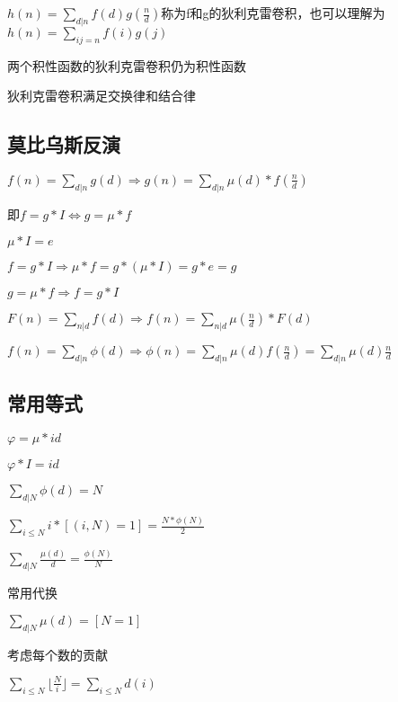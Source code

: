 \documentclass[UTF8]{ctexart}
\begin{document}
$h(n)=\sum_{d|n}f(d)g(\frac{n}{d})$称为f和g的狄利克雷卷积，也可以理解为$h(n)=\sum_{ij=n}f(i)g(j)$\par

两个积性函数的狄利克雷卷积仍为积性函数\par

狄利克雷卷积满足交换律和结合律\par

\subsection{莫比乌斯反演}

$f(n)=\sum_{d|n}g(d)\Rightarrow g(n)=\sum_{d|n}\mu(d)*f(\frac{n}{d})$\par
即$f=g*I \Leftrightarrow g=\mu*f$\par
$\mu*I=e$\par
$f=g*I \Rightarrow \mu*f = g*(\mu*I)=g*e=g$\par
$g=\mu*f \Rightarrow f=g*I$\par

$F(n)=\sum_{n|d}f(d)\Rightarrow f(n)=\sum_{n|d}\mu(\frac{n}{d})*F(d)$\par

$f(n)=\sum_{d|n}\phi(d)\Rightarrow \phi(n)=\sum_{d|n}\mu(d)f(\frac{n}{d})=\sum_{d|n}\mu(d)\frac{n}{d}$\par

\subsection{常用等式}

$\varphi = \mu * id$\par

$\varphi * I = id$\par

$\sum_{d|N}\phi(d)=N$\par

$\sum_{i\leq N}i*[(i,N)=1]=\frac{N*\phi(N)}{2}$\par

$\sum_{d|N}\frac{\mu(d)}{d}=\frac{\phi(N)}{N}$\par

常用代换\par

$\sum_{d|N}\mu(d)=[N=1]$\par

考虑每个数的贡献\par

$\sum_{i\leq N}\lfloor \frac{N}{i}\rfloor=\sum_{i\leq N}d(i)$\par
\end{document}
